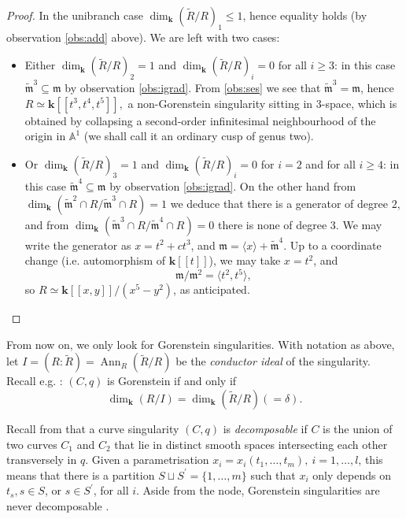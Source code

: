\documentclass{compositio}
\renewcommand{\k}{\mathbf k}
\newcommand{\m}{\mathfrak m}
\newcommand{\tR}{\widetilde{R}}
\newcommand{\tm}{\widetilde{\mathfrak m}}
\newcommand{\Aaff}{\mathbb A}
\theoremstyle{plain}
\theoremstyle{definition}
\theoremstyle{remark}
\begin{document}
\begin{proof}
 In the unibranch case $\dim_\k(\tR/R)_1\leq 1$, hence equality holds (by observation \eqref{obs:add} above). We are left with two cases:
 \begin{itemize}[leftmargin=15pt]
  \item Either $\dim_\k(\tR/R)_2=1$ and $\dim_\k(\tR/R)_i=0$ for all $i\geq 3$: in this case $\tm^3\subseteq\m$ by observation \eqref{obs:igrad}. From \eqref{obs:ses} we see that $\tm^3=\m$, hence $R\simeq\k[\![t^3,t^4,t^5]\!],$ a non-Gorenstein singularity sitting in $3$-space, which is obtained by collapsing a second-order infinitesimal neighbourhood of the origin in $\Aaff^1$ (we shall call it an ordinary cusp of genus two).
  
  \item Or $\dim_\k(\tR/R)_3=1$ and $\dim_\k(\tR/R)_i=0$ for $i=2$ and for all $i\geq 4$: in this case $\tm^4\subseteq\m$ by observation \eqref{obs:igrad}. On the other hand from $\dim_\k(\tm^2\cap R/\tm^3\cap R)=1$ we deduce that there is a generator of degree $2$, and from $\dim_\k(\tm^3\cap R/\tm^4\cap R)=0$ there is none of degree $3$. We may write the generator as $x=t^2+ct^3$, and $\m=\langle x\rangle+\tm^4$. Up to a coordinate change (i.e. automorphism of $\k[\![t]\!]$), we may take $x=t^2$, and \[\m/\m^2=\langle t^2,t^5\rangle,\] so $R\simeq\k[\![x,y]\!]/(x^5-y^2)$, as anticipated.
 \end{itemize}
\end{proof}

From now on, we only look for Gorenstein singularities. With notation as above, let $I=(R:\tilde R)=\operatorname{Ann}_R(\tilde R/R)$ be the \emph{conductor ideal} of the singularity. Recall e.g. \cite[Proposition VIII.1.16]{AK}: $(C,q)$ is Gorenstein if and only if
\[\dim_\k(R/I)=\dim_\k(\tR/R)(=\delta).\]

Recall from \cite[Definition 2-1]{Stev} that a curve singularity $(C,q)$ is \emph{decomposable} if $C$ is the union of two curves $C_1$ and $C_2$ that lie in distinct smooth spaces intersecting each other transversely in $q$. Given a parametrisation $x_i=x_i(t_1,\ldots,t_m),\ i=1,\ldots,l$, this means that there is a partition $S\sqcup S^\prime=\{1,\ldots,m\}$ such that $x_i$ only depends on $t_s,s\in S$, or $s\in S^\prime$, for all $i$. Aside from the node, Gorenstein singularities are never decomposable \cite[Proposition 2.1]{AFSGm}.
\end{document}
